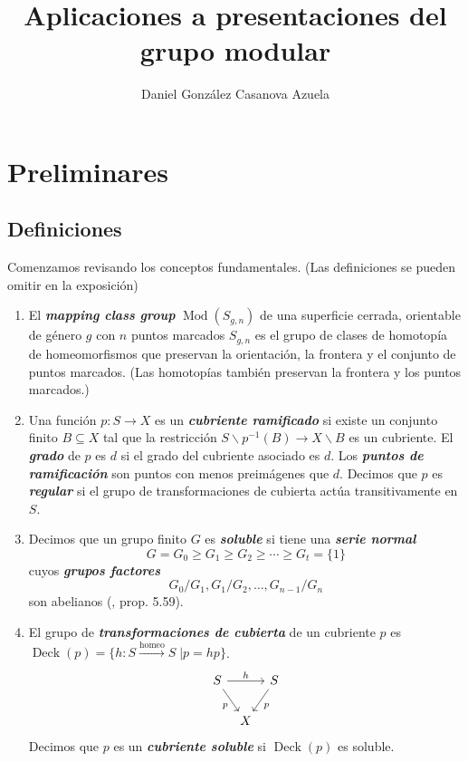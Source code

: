 \documentclass[spanish]{article}
\title{Aplicaciones a presentaciones del grupo modular}
\date{}
\author{Daniel González Casanova Azuela}
\theoremstyle{definition}
\DeclareMathOperator{\Mod}{Mod}
\DeclareMathOperator{\Deck}{Deck}
\renewcommand{\contentsname}{}
\begin{document}
	\maketitle
	\vspace{-2cm}
	\tableofcontents
\section{Preliminares}
\subsection{Definiciones}
Comenzamos revisando los conceptos fundamentales. (Las definiciones se pueden omitir en la exposición)

	\begin{enumerate}
		\item El \textbf{\textit{mapping class group}} $\Mod(S_{g,n})$ de una superficie cerrada, orientable de género $g$ con $n$ puntos marcados $S_{g,n}$ es el grupo de clases de homotopía de homeomorfismos que preservan la orientación, la frontera y el conjunto de puntos marcados. (Las homotopías también preservan la frontera y los puntos marcados.)
		
		\item Una función $p:S\to X$ es un \textbf{\textit{cubriente ramificado}} si existe un conjunto finito $B\subseteq X$ tal que la restricción $S\backslash p^{-1}(B)\to X\backslash B$ es un cubriente. El \textbf{\textit{grado}}  de $p$ es $d$ si el grado del cubriente asociado es $d$. Los \textbf{\textit{puntos de ramificación}} son puntos con menos preimágenes que $d$. Decimos que $p$ es \textbf{\textit{regular}} si el grupo de transformaciones de cubierta actúa transitivamente en $S$.
		
		\item Decimos que un grupo finito $G$ es \textbf{\textit{soluble}} si tiene una \textbf{\textit{serie normal}}
		\[G=G_0\geq G_1\geq G_2\geq\cdots\geq G_t=\{1\}\]
		cuyos \textbf{\textit{grupos factores}}
		\[G_0/G_1,G_1/G_2,\ldots,G_{n-1}/G_n\]
		son abelianos (\cite{Rotman}, prop. 5.59).
		
		\item El grupo de \textbf{\textit{transformaciones de cubierta}} de un cubriente $p$ es ${\operatorname{Deck}(p)=\{h:S\overset{\text{homeo}}{\longrightarrow} S\;|p=hp\}}$.
		\[\begin{tikzcd}[column sep=tiny]
			S\arrow[rr,"h"]\arrow[rd,"p",swap]&&S\arrow[ld,"p"]\\
			&X
		\end{tikzcd}\]
		Decimos que $p$ es un \textbf{\textit{cubriente soluble}} si $\Deck(p)$ es soluble.
		

\end{enumerate}
\end{document}
